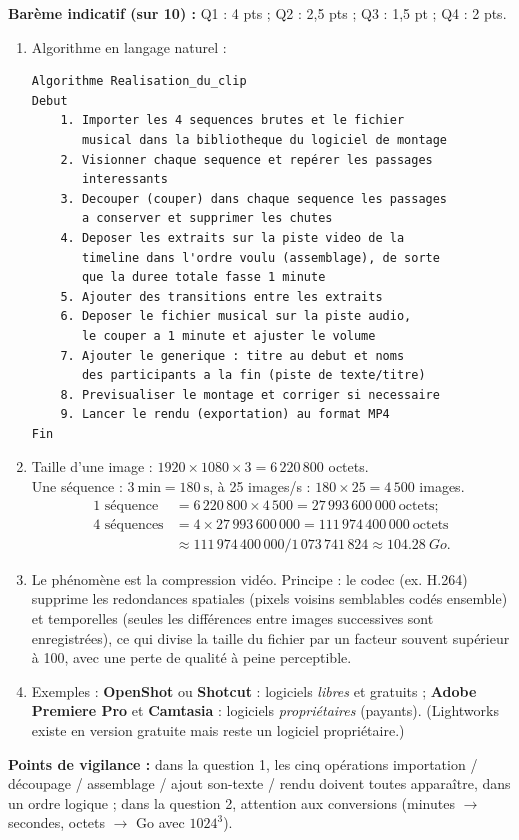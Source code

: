 \documentclass[11pt]{article}
\newcommand{\cle}[1]{{\popxbold\color{popdark}#1}}
\begin{document}
\begin{corrige}
\textbf{Barème indicatif (sur 10) :} Q1 : 4 pts ; Q2 : 2,5 pts ; Q3 : 1,5 pt ; Q4 : 2 pts.

\begin{enumerate}
  \item Algorithme en langage naturel :
\begin{lstlisting}
Algorithme Realisation_du_clip
Debut
    1. Importer les 4 sequences brutes et le fichier
       musical dans la bibliotheque du logiciel de montage
    2. Visionner chaque sequence et repérer les passages
       interessants
    3. Decouper (couper) dans chaque sequence les passages
       a conserver et supprimer les chutes
    4. Deposer les extraits sur la piste video de la
       timeline dans l'ordre voulu (assemblage), de sorte
       que la duree totale fasse 1 minute
    5. Ajouter des transitions entre les extraits
    6. Deposer le fichier musical sur la piste audio,
       le couper a 1 minute et ajuster le volume
    7. Ajouter le generique : titre au debut et noms
       des participants a la fin (piste de texte/titre)
    8. Previsualiser le montage et corriger si necessaire
    9. Lancer le rendu (exportation) au format MP4
Fin
\end{lstlisting}
  \item Taille d'une image : $1920 \times 1080 \times 3 = 6\,220\,800$ octets.\\
  Une séquence : $3~\text{min} = 180~\text{s}$, à 25 images/s : $180 \times 25 = 4\,500$ images.
  \begin{align*}
  \text{1 séquence} &= 6\,220\,800 \times 4\,500 = 27\,993\,600\,000~\text{octets} ;\\
  \text{4 séquences} &= 4 \times 27\,993\,600\,000 = 111\,974\,400\,000~\text{octets} \\
  &\approx 111\,974\,400\,000 / 1\,073\,741\,824 \approx \SI{104,28}{Go}.
  \end{align*}
  \item Le phénomène est la \cle{compression} vidéo. Principe : le codec (ex. H.264) supprime les redondances spatiales (pixels voisins semblables codés ensemble) et temporelles (seules les différences entre images successives sont enregistrées), ce qui divise la taille du fichier par un facteur souvent supérieur à 100, avec une perte de qualité à peine perceptible.
  \item Exemples : \textbf{OpenShot} ou \textbf{Shotcut} : logiciels \emph{libres} et gratuits ; \textbf{Adobe Premiere Pro} et \textbf{Camtasia} : logiciels \emph{propriétaires} (payants). (Lightworks existe en version gratuite mais reste un logiciel propriétaire.)
\end{enumerate}
\textbf{Points de vigilance :} dans la question 1, les cinq opérations importation / découpage / assemblage / ajout son-texte / rendu doivent toutes apparaître, dans un ordre logique ; dans la question 2, attention aux conversions (minutes $\to$ secondes, octets $\to$ Go avec $1024^3$).
\end{corrige}
\end{document}
